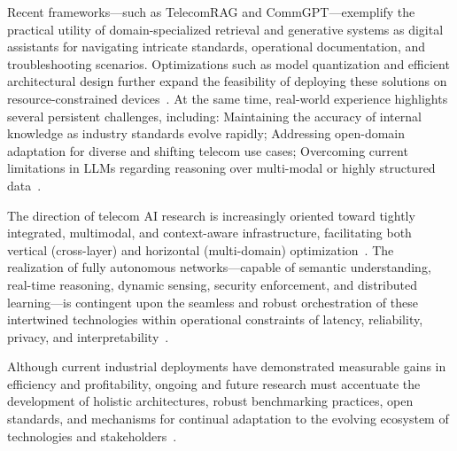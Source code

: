 \documentclass[sigconf]{acmart}
\begin{document}
Recent frameworks—such as TelecomRAG and CommGPT—exemplify the practical utility of domain-specialized retrieval and generative systems as digital assistants for navigating intricate standards, operational documentation, and troubleshooting scenarios. Optimizations such as model quantization and efficient architectural design further expand the feasibility of deploying these solutions on resource-constrained devices~\cite{ref11,ref22,ref29}. At the same time, real-world experience highlights several persistent challenges, including:
Maintaining the accuracy of internal knowledge as industry standards evolve rapidly;
Addressing open-domain adaptation for diverse and shifting telecom use cases;
Overcoming current limitations in LLMs regarding reasoning over multi-modal or highly structured data~\cite{ref21,ref29}.

The direction of telecom AI research is increasingly oriented toward tightly integrated, multimodal, and context-aware infrastructure, facilitating both vertical (cross-layer) and horizontal (multi-domain) optimization~\cite{ref24,ref25}. The realization of fully autonomous networks—capable of semantic understanding, real-time reasoning, dynamic sensing, security enforcement, and distributed learning—is contingent upon the seamless and robust orchestration of these intertwined technologies within operational constraints of latency, reliability, privacy, and interpretability~\cite{ref14,ref19,ref20,ref24,ref26}.

Although current industrial deployments have demonstrated measurable gains in efficiency and profitability, ongoing and future research must accentuate the development of holistic architectures, robust benchmarking practices, open standards, and mechanisms for continual adaptation to the evolving ecosystem of technologies and stakeholders~\cite{ref11,ref21,ref22,ref23,ref24,ref25,ref49}.
\end{document}
